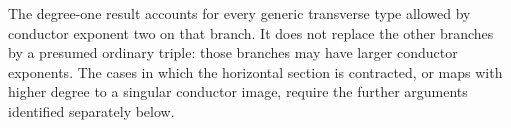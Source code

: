 The degree-one result accounts for every generic transverse
type allowed by conductor exponent two on that branch. It
does not replace the other branches by a presumed ordinary
triple: those branches may have larger conductor exponents.
The cases in which the horizontal section is contracted, or
maps with higher degree to a singular conductor image, require
the further arguments identified separately below.




